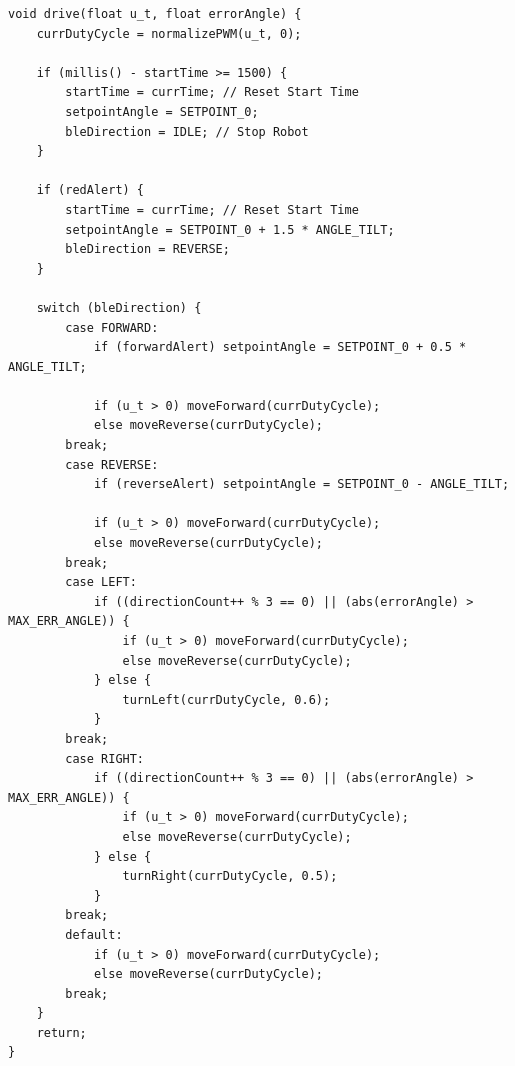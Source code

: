 \documentclass{article}
\begin{document}
\begin{lstlisting}[caption={Arduino Movement Firmware Implementation}, label={lst:arduino_movement_code}]
void drive(float u_t, float errorAngle) {
    currDutyCycle = normalizePWM(u_t, 0);

    if (millis() - startTime >= 1500) {
        startTime = currTime; // Reset Start Time
        setpointAngle = SETPOINT_0;
        bleDirection = IDLE; // Stop Robot
    }

    if (redAlert) {
        startTime = currTime; // Reset Start Time
        setpointAngle = SETPOINT_0 + 1.5 * ANGLE_TILT;
        bleDirection = REVERSE;
    }

    switch (bleDirection) {
        case FORWARD:
            if (forwardAlert) setpointAngle = SETPOINT_0 + 0.5 * ANGLE_TILT;

            if (u_t > 0) moveForward(currDutyCycle);
            else moveReverse(currDutyCycle);
        break;
        case REVERSE:
            if (reverseAlert) setpointAngle = SETPOINT_0 - ANGLE_TILT;

            if (u_t > 0) moveForward(currDutyCycle);
            else moveReverse(currDutyCycle);
        break;
        case LEFT:
            if ((directionCount++ % 3 == 0) || (abs(errorAngle) > MAX_ERR_ANGLE)) {
                if (u_t > 0) moveForward(currDutyCycle);
                else moveReverse(currDutyCycle);
            } else {
                turnLeft(currDutyCycle, 0.6);
            }
        break;
        case RIGHT:
            if ((directionCount++ % 3 == 0) || (abs(errorAngle) > MAX_ERR_ANGLE)) {
                if (u_t > 0) moveForward(currDutyCycle);
                else moveReverse(currDutyCycle);
            } else {
                turnRight(currDutyCycle, 0.5);
            }
        break;
        default:
            if (u_t > 0) moveForward(currDutyCycle);
            else moveReverse(currDutyCycle);
        break;
    }
    return;
}
\end{lstlisting}
\end{document}
